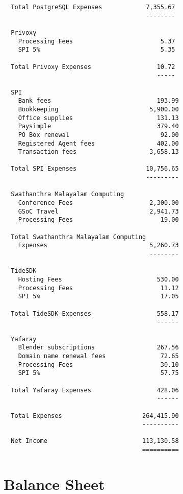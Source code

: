 \documentclass[letterpaper]{report}
\begin{document}
\begin{verbatim}
  Total PostgreSQL Expenses            7,355.67
                                       --------

  Privoxy
    Processing Fees                        5.37
    SPI 5%                                 5.35

  Total Privoxy Expenses                  10.72
                                          -----

  SPI
    Bank fees                             193.99
    Bookkeeping                         5,900.00
    Office supplies                       131.13
    Paysimple                             379.40
    PO Box renewal                         92.00
    Registered Agent fees                 402.00
    Transaction fees                    3,658.13

  Total SPI Expenses                   10,756.65
                                       ---------

  Swathanthra Malayalam Computing
    Conference Fees                     2,300.00
    GSoC Travel                         2,941.73
    Processing Fees                        19.00

  Total Swathanthra Malayalam Computing
    Expenses                            5,260.73
                                        --------

  TideSDK
    Hosting Fees                          530.00
    Processing Fees                        11.12
    SPI 5%                                 17.05

  Total TideSDK Expenses                  558.17
                                          ------

  Yafaray
    Blender subscriptions                 267.56
    Domain name renewal fees               72.65
    Processing Fees                        30.10
    SPI 5%                                 57.75

  Total Yafaray Expenses                  428.06
                                          ------

  Total Expenses                      264,415.90
                                      ----------

  Net Income                          113,130.58
                                      ==========
\end{verbatim}

\section{Balance Sheet}
\end{document}
